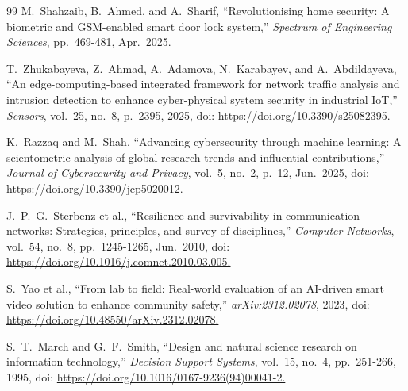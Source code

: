 \begin{thebibliography}{99}
M.~Shahzaib, B.~Ahmed, and A.~Sharif, ``Revolutionising home security: A biometric and GSM-enabled smart door lock system,''
\textit{Spectrum of Engineering Sciences}, pp.~469-481, Apr.~2025.

T.~Zhukabayeva, Z.~Ahmad, A.~Adamova, N.~Karabayev, and A.~Abdildayeva, ``An edge-computing-based integrated framework for network traffic analysis and intrusion detection to enhance cyber-physical system security in industrial IoT,''
\textit{Sensors}, vol.~25, no.~8, p.~2395, 2025,
doi: \url{https://doi.org/10.3390/s25082395.}

K.~Razzaq and M.~Shah, ``Advancing cybersecurity through machine learning: A scientometric analysis of global research trends and influential contributions,''
\textit{Journal of Cybersecurity and Privacy}, vol.~5, no.~2, p.~12, Jun.~2025,
doi: \url{https://doi.org/10.3390/jcp5020012.}

J.~P.~G.~Sterbenz et al., ``Resilience and survivability in communication networks: Strategies, principles, and survey of disciplines,''
\textit{Computer Networks}, vol.~54, no.~8, pp.~1245-1265, Jun.~2010,
doi: \url{https://doi.org/10.1016/j.comnet.2010.03.005.}

S.~Yao et al., ``From lab to field: Real-world evaluation of an AI-driven smart video solution to enhance community safety,''
\textit{arXiv:2312.02078}, 2023,
doi: \url{https://doi.org/10.48550/arXiv.2312.02078.}

S.~T.~March and G.~F.~Smith, ``Design and natural science research on information technology,''
\textit{Decision Support Systems}, vol.~15, no.~4, pp.~251-266, 1995,
doi: \url{https://doi.org/10.1016/0167-9236(94)00041-2.}

\end{thebibliography}
